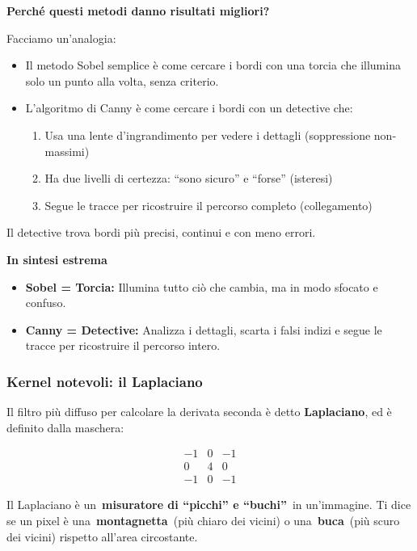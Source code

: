 \documentclass[
]{article}
\providecommand{\tightlist}{%
  \setlength{\itemsep}{0pt}\setlength{\parskip}{0pt}}
\begin{document}
\textbf{Perché questi metodi danno risultati migliori?}

Facciamo un'analogia:

\begin{itemize}
\tightlist
\item
  Il metodo Sobel semplice è come cercare i bordi con una torcia che illumina solo un punto alla volta, senza criterio.
\item
  L'algoritmo di Canny è come cercare i bordi con un detective che:

  \begin{enumerate}
  \def\labelenumi{\arabic{enumi}.}
  \tightlist
  \item
    Usa una lente d'ingrandimento per vedere i dettagli (soppressione non-massimi)
  \item
    Ha due livelli di certezza: ``sono sicuro'' e ``forse'' (isteresi)
  \item
    Segue le tracce per ricostruire il percorso completo (collegamento)
  \end{enumerate}
\end{itemize}

Il detective trova bordi più precisi, continui e con meno errori.

\textbf{In sintesi estrema}

\begin{itemize}
\tightlist
\item
  \textbf{Sobel = Torcia:} Illumina tutto ciò che cambia, ma in modo sfocato e confuso.
\item
  \textbf{Canny = Detective:} Analizza i dettagli, scarta i falsi indizi e segue le tracce per ricostruire il percorso intero.
\end{itemize}

\hypertarget{kernel-notevoli-il-laplaciano}{%
\subsubsection{Kernel notevoli: il Laplaciano}\label{kernel-notevoli-il-laplaciano}}

Il filtro più diffuso per calcolare la derivata seconda è detto \textbf{Laplaciano}, ed è definito dalla maschera:

\[
\begin{matrix}-1 & 0 & -1\\0 & 4 & 0 \\-1 & 0 & -1 \end{matrix}
\]

Il Laplaciano è un~\textbf{misuratore di ``picchi'' e ``buchi''}~in un'immagine. Ti dice se un pixel è una~\textbf{montagnetta}~(più chiaro dei vicini) o una~\textbf{buca}~(più scuro dei vicini) rispetto all'area circostante.
\end{document}
